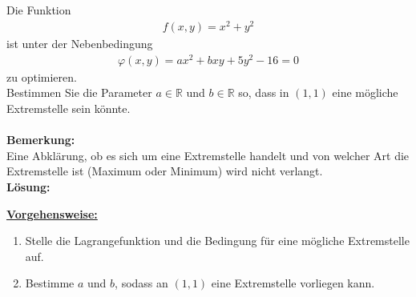 \subsection*{}
Die Funktion
\begin{align*}
f(x,y) = x^2 + y^2
\end{align*}
ist unter der Nebenbedingung
\begin{align*}
\varphi(x,y)
=
a x^2 +bxy+5y^2-16 = 0
\end{align*}
zu optimieren.\\
Bestimmen Sie die Parameter $ a \in \mathbb{R} $ und $ b \in \mathbb{R} $ so, dass in $ (1,1) $ eine mögliche Extremstelle sein könnte.\\
\\
\textbf{Bemerkung:} \\
Eine Abklärung, ob es sich um eine Extremstelle handelt und von welcher Art die Extremstelle ist (Maximum oder Minimum) wird nicht verlangt.\\

\textbf{Lösung:}
\begin{mdframed}
\underline{\textbf{Vorgehensweise:}}
\renewcommand{\labelenumi}{\theenumi.}
\begin{enumerate}
\item Stelle die Lagrangefunktion und die Bedingung für eine mögliche Extremstelle auf.

\item  Bestimme $ a $ und $ b $, sodass an $ (1,1) $ eine Extremstelle vorliegen kann.
\end{enumerate}
\end{mdframed}

